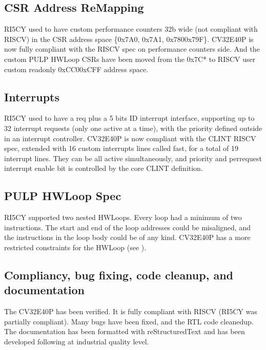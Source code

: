 \documentclass[letterpaper,10pt,english]{sphinxmanual}
\begin{document}
\subsection{CSR Address Re\sphinxhyphen{}Mapping}
\label{\detokenize{intro:csr-address-re-mapping}}
\sphinxAtStartPar
RI5CY used to have custom performance counters 32b wide (not compliant with RISC\sphinxhyphen{}V) in the CSR address space \{0x7A0, 0x7A1, 0x780\sphinxhyphen{}0x79F\}.
CV32E40P is now fully compliant with the RISC\sphinxhyphen{}V spec on performance counters side.
And the custom PULP HWLoop CSRs have been moved from the 0x7C* to RISC\sphinxhyphen{}V user custom read\sphinxhyphen{}only 0xCC0\sphinxhyphen{}0xCFF address space.


\subsection{Interrupts}
\label{\detokenize{intro:interrupts}}
\sphinxAtStartPar
RI5CY used to have a req plus a 5 bits ID interrupt interface, supporting up to 32 interrupt requests (only one active at a time), with the priority defined outside in an interrupt controller. CV32E40P is now compliant with the CLINT RISC\sphinxhyphen{}V spec, extended with 16 custom interrupts lines called fast, for a total of 19 interrupt lines. They can be all active simultaneously, and priority and per\sphinxhyphen{}request interrupt enable bit is controlled by the core CLINT definition.


\subsection{PULP HWLoop Spec}
\label{\detokenize{intro:pulp-hwloop-spec}}
\sphinxAtStartPar
RI5CY supported two nested HWLoops. Every loop had a minimum of two instructions. The start and end of the loop addresses
could be misaligned, and the instructions in the loop body could be of any kind. CV32E40P has a more restricted constraints for the HWLoop (see  {\hyperref[\detokenize{corev_hw_loop:hwloop-specs}]{}}).


\subsection{Compliancy, bug fixing, code clean\sphinxhyphen{}up, and documentation}
\label{\detokenize{intro:compliancy-bug-fixing-code-clean-up-and-documentation}}
\sphinxAtStartPar
The CV32E40P has been verified. It is fully compliant with RISC\sphinxhyphen{}V (RI5CY was partially compliant). Many bugs have been fixed, and the RTL code cleaned\sphinxhyphen{}up. The documentation has been formatted with reStructuredText and has been developed following at industrial quality level.
\end{document}

